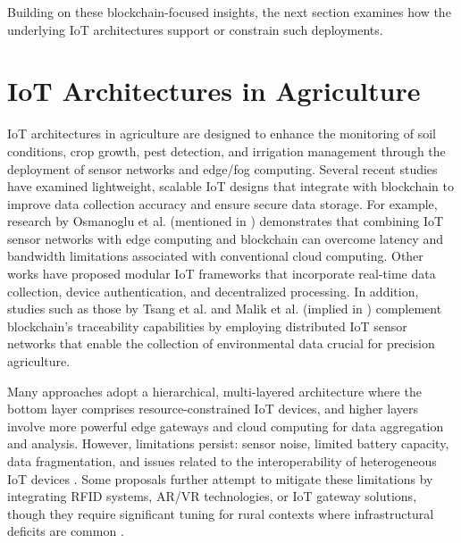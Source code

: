 \documentclass[12pt,onecolumn]{IEEEtran} %
\begin{document}
Building on these blockchain-focused insights, the next section examines how the underlying IoT architectures support or constrain such deployments.


\section{IoT Architectures in Agriculture}\label{sec:iot-architectures}
IoT architectures in agriculture are designed to enhance the monitoring of soil conditions, crop growth, pest detection, and irrigation management through the deployment of sensor networks and edge/fog computing. Several recent studies have examined lightweight, scalable IoT designs that integrate with blockchain to improve data collection accuracy and ensure secure data storage. For example, research by Osmanoglu et al. (mentioned in \cite{ellahi2023blockchainbasedframeworksfor}) demonstrates that combining IoT sensor networks with edge computing and blockchain can overcome latency and bandwidth limitations associated with conventional cloud computing. Other works have proposed modular IoT frameworks that incorporate real-time data collection, device authentication, and decentralized processing. In addition, studies such as those by Tsang et al. \cite{tang2024assessingblockchainand} and Malik et al. (implied in \cite{ellahi2023blockchainbasedframeworksfor}) complement blockchain's traceability capabilities by employing distributed IoT sensor networks that enable the collection of environmental data crucial for precision agriculture.

Many approaches adopt a hierarchical, multi-layered architecture where the bottom layer comprises resource-constrained IoT devices, and higher layers involve more powerful edge gateways and cloud computing for data aggregation and analysis. However, limitations persist: sensor noise, limited battery capacity, data fragmentation, and issues related to the interoperability of heterogeneous IoT devices \cite{aliyu2023blockchainbasedsmartfarm, ali2022blockchainenabledarchitecture}. Some proposals further attempt to mitigate these limitations by integrating RFID systems, AR/VR technologies, or IoT gateway solutions, though they require significant tuning for rural contexts where infrastructural deficits are common \cite{tang2024assessingblockchainand}.
\end{document}

